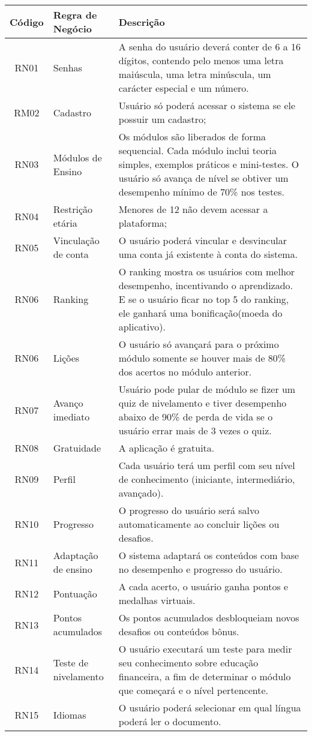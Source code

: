 \documentclass[
	article,			%
	12pt,				%
	oneside,			%
	a4paper,			%
	english,			%
	brazil,				%
	sumario=tradicional
	]{abntex2}
\begin{document}
\begin{tabular}{|c|l|p{8cm}|}
\hline
\textbf{Código} & \textbf{Regra de Negócio} & \textbf{Descrição} \\
\hline
RN01 & Senhas & A senha do usuário deverá conter de 6 a 16 dígitos, contendo pelo menos uma letra maiúscula, uma letra minúscula, um carácter especial e um número. \\
\hline
RM02 & Cadastro & Usuário só poderá acessar o sistema se ele possuir um cadastro; \\
\hline
RN03 & Módulos de Ensino & Os módulos são liberados de forma sequencial. Cada módulo inclui teoria simples, exemplos práticos e mini-testes. O usuário só avança de nível se obtiver um desempenho mínimo de 70\% nos testes. \\
\hline
RN04 & Restrição etária & Menores de 12 não devem acessar a plataforma; \\
\hline
RN05 & Vinculação de conta & O usuário poderá vincular e desvincular uma conta já existente à conta do sistema. \\
\hline
RN06 & Ranking &  O ranking mostra os usuários com melhor desempenho, incentivando o aprendizado. E se o usuário ficar no top 5 do ranking, ele ganhará uma bonificação(moeda do aplicativo). \\
\hline
RN06 & Lições & O usuário só avançará para o próximo módulo somente se houver mais de 80\% dos acertos no módulo anterior. \\
\hline
RN07 & Avanço imediato & Usuário pode pular de módulo se fizer um quiz de nivelamento e tiver desempenho abaixo de 90\% de perda de vida se o usuário errar mais de 3 vezes o quiz.\\
\hline
RN08 & Gratuidade & A aplicação é gratuita.\\
\hline
RN09 & Perfil & Cada usuário terá um perfil com seu nível de conhecimento (iniciante, intermediário, avançado).\\
\hline
RN10 & Progresso & O progresso do usuário será salvo automaticamente ao concluir lições ou desafios. \\
\hline
RN11 & Adaptação de ensino & O sistema adaptará os conteúdos com base no desempenho e progresso do usuário.\\
\hline
RN12 & Pontuação & A cada acerto, o usuário ganha pontos e medalhas virtuais. \\
\hline
RN13 & Pontos acumulados & Os pontos acumulados desbloqueiam novos desafios ou conteúdos bônus. \\
\hline
RN14 & Teste de nivelamento & O usuário executará um teste para medir seu conhecimento sobre educação financeira, a fim de determinar o módulo que começará e o nível pertencente. \\
\hline
RN15 & Idiomas & O usuário poderá selecionar em qual língua poderá ler o documento. \\
\hline
\end{tabular}
\end{document}
